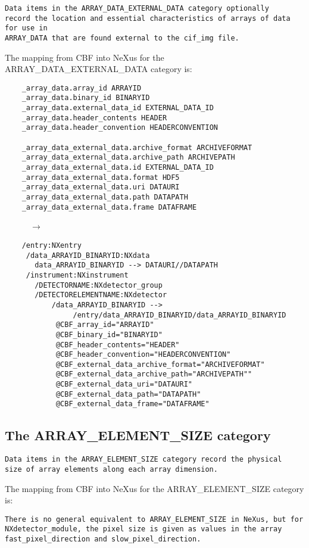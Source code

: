 \documentclass[11pt]{article}
\begin{document}
{\footnotesize\begin{verbatim}
Data items in the ARRAY_DATA_EXTERNAL_DATA category optionally
record the location and essential characteristics of arrays of data for use in 
ARRAY_DATA that are found external to the cif_img file.
\end{verbatim}

The mapping from CBF into NeXus for the ARRAY\_DATA\_EXTERNAL\_DATA category is:

\begin{verbatim}     
    _array_data.array_id ARRAYID
    _array_data.binary_id BINARYID
    _array_data.external_data_id EXTERNAL_DATA_ID
    _array_data.header_contents HEADER
    _array_data.header_convention HEADERCONVENTION

    _array_data_external_data.archive_format ARCHIVEFORMAT
    _array_data_external_data.archive_path ARCHIVEPATH
    _array_data_external_data.id EXTERNAL_DATA_ID
    _array_data_external_data.format HDF5
    _array_data_external_data.uri DATAURI
    _array_data_external_data.path DATAPATH
    _array_data_external_data.frame DATAFRAME
\end{verbatim}
~~~~~~$\rightarrow$\\
\begin{verbatim}
    /entry:NXentry
     /data_ARRAYID_BINARYID:NXdata
       data_ARRAYID_BINARYID --> DATAURI//DATAPATH
     /instrument:NXinstrument
       /DETECTORNAME:NXdetector_group
       /DETECTORELEMENTNAME:NXdetector
           /data_ARRAYID_BINARYID -->
                /entry/data_ARRAYID_BINARYID/data_ARRAYID_BINARYID
            @CBF_array_id="ARRAYID"
            @CBF_binary_id="BINARYID"
            @CBF_header_contents="HEADER"
            @CBF_header_convention="HEADERCONVENTION"
            @CBF_external_data_archive_format="ARCHIVEFORMAT"
            @CBF_external_data_archive_path="ARCHIVEPATH""
            @CBF_external_data_uri="DATAURI"
            @CBF_external_data_path="DATAPATH"
            @CBF_external_data_frame="DATAFRAME"
\end{verbatim}
}

\subsection{The ARRAY\_ELEMENT\_SIZE category}

{\footnotesize\begin{verbatim}
Data items in the ARRAY_ELEMENT_SIZE category record the physical
size of array elements along each array dimension.
\end{verbatim}

The mapping from CBF into NeXus for the ARRAY\_ELEMENT\_SIZE category is:

\begin{verbatim}     
There is no general equivalent to ARRAY_ELEMENT_SIZE in NeXus, but for 
NXdetector_module, the pixel size is given as values in the array
fast_pixel_direction and slow_pixel_direction.
\end{verbatim}
}
\end{document}
